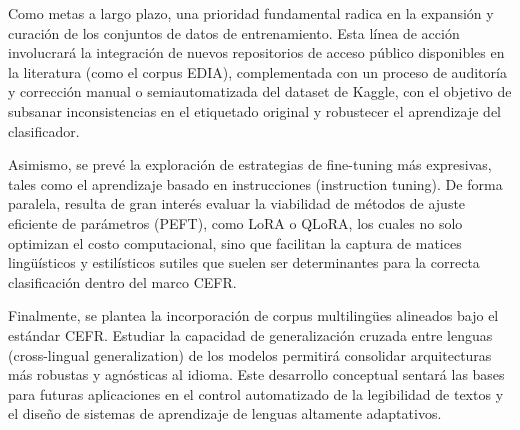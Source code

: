 Como metas a largo plazo, una prioridad fundamental radica en la expansión y curación de los conjuntos de datos de entrenamiento. Esta línea de acción involucrará la integración de nuevos repositorios de acceso público disponibles en la literatura (como el corpus EDIA), complementada con un proceso de auditoría y corrección manual o semiautomatizada del dataset de Kaggle, con el objetivo de subsanar inconsistencias en el etiquetado original y robustecer el aprendizaje del clasificador.

Asimismo, se prevé la exploración de estrategias de fine-tuning más expresivas, tales como el aprendizaje basado en instrucciones (instruction tuning). De forma paralela, resulta de gran interés evaluar la viabilidad de métodos de ajuste eficiente de parámetros (PEFT), como LoRA o QLoRA, los cuales no solo optimizan el costo computacional, sino que facilitan la captura de matices lingüísticos y estilísticos sutiles que suelen ser determinantes para la correcta clasificación dentro del marco CEFR.

Finalmente, se plantea la incorporación de corpus multilingües alineados bajo el estándar CEFR. Estudiar la capacidad de generalización cruzada entre lenguas (cross-lingual generalization) de los modelos permitirá consolidar arquitecturas más robustas y agnósticas al idioma. Este desarrollo conceptual sentará las bases para futuras aplicaciones en el control automatizado de la legibilidad de textos y el diseño de sistemas de aprendizaje de lenguas altamente adaptativos.
